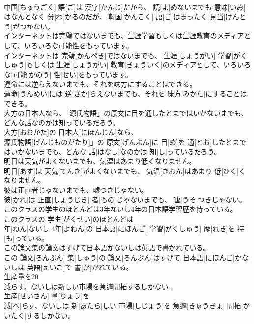 \documentclass[8pt]{extreport}
\begin{document}
\begin{CJK}{UTF8}{min}
\\	中国[ちゅうごく] 語[ご]は 漢字[かんじ]だから、 読[よ]めないまでも 意味[いみ]はなんとなく 分[わ]かるのだが、 韓国[かんこく] 語[ご]はまったく 見当[けんとう]がつかない。
\\	インターネットは完璧ではないまでも、生涯学習もしくは生涯教育のメディアとして、いろいろな可能性をもっています。	
\\	インターネットは 完璧[かんぺき]ではないまでも、 生涯[しょうがい] 学習[がくしゅう]もしくは 生涯[しょうがい] 教育[きょういく]のメディアとして、いろいろな 可能[かのう] 性[せい]をもっています。
\\	運命には逆らえないまでも、それを味方にすることはできる。	
\\	運命[うんめい]には 逆[さか]らえないまでも、それを 味方[みかた]にすることはできる。
\\	大方の日本人なら、「源氏物語」の原文に目を通したとまではいかないまでも、どんな話なのかは知っているだろう。	
\\	大方[おおかた]の 日本人[にほんじん]なら、
\\	源氏物語[げんじものがたり]」の 原文[げんぶん]に 目[め]を 通[とお]したとまではいかないまでも、どんな 話[はなし]なのかは 知[し]っているだろう。
\\	明日は天気がよくないまでも、気温はあまり低くなりません。	
\\	明日[あす]は 天気[てんき]がよくないまでも、 気温[きおん]はあまり 低[ひく]くなりません。
\\	彼は正直者じゃないまでも、嘘つきじゃない。	
\\	彼[かれ]は 正直[しょうじき] 者[もの]じゃないまでも、 嘘[うそ]つきじゃない。
\\	このクラスの学生のほとんどは3年ないし4年の日本語学習歴を持っている。	
\\	このクラスの 学生[がくせい]のほとんどは 
\\	年[ねん]ないし 4年[よねん]の 日本語[にほんご] 学習[がくしゅう] 歴[れき]を 持[も]っている。
\\	この論文集の論文はすげて日本語かないしは英語で書かれている。	
\\	この 論文[ろんぶん] 集[しゅう]の 論文[ろんぶん]はすげて 日本語[にほんご]かないしは 英語[えいご]で 書[か]かれている。
\\	生産量を20
\\	減らす、ないしは新しい市場を急遽開拓するしかない。	
\\	生産[せいさん] 量[りょう]を 
\\	減[へ]らす、ないしは 新[あたら]しい 市場[しじょう]を 急遽[きゅうきょ] 開拓[かいたく]するしかない。

\end{CJK}
\end{document}
